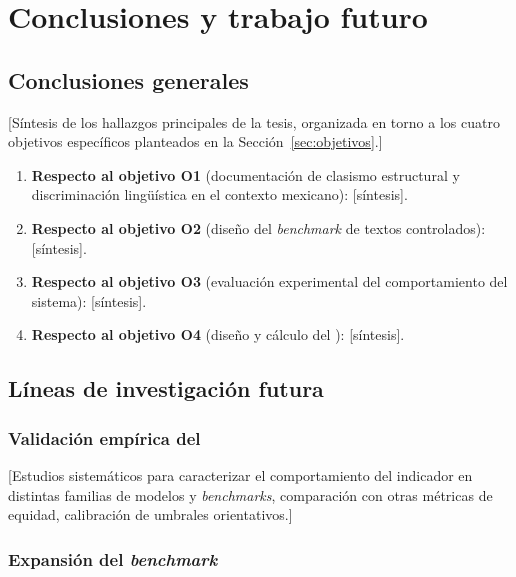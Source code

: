 \chapter{Conclusiones y trabajo futuro}
\label{cap:conclusiones}

\section{Conclusiones generales}
\label{sec:conclusiones-generales}

[Síntesis de los hallazgos principales de la tesis, organizada en torno a los
cuatro objetivos específicos planteados en la Sección~\ref{sec:objetivos}.]

\begin{enumerate}[label=\textbf{C\arabic*.},leftmargin=2.2em]
  \item \textbf{Respecto al objetivo O1} (documentación de clasismo
    estructural y discriminación lingüística en el contexto mexicano):
    [síntesis].
  \item \textbf{Respecto al objetivo O2} (diseño del \emph{benchmark} de
    textos controlados): [síntesis].
  \item \textbf{Respecto al objetivo O3} (evaluación experimental del
    comportamiento del sistema): [síntesis].
  \item \textbf{Respecto al objetivo O4} (diseño y cálculo del \INS):
    [síntesis].
\end{enumerate}

\section{Líneas de investigación futura}
\label{sec:trabajo-futuro}

\subsection{Validación empírica del \INS}

[Estudios sistemáticos para caracterizar el comportamiento del indicador en
distintas familias de modelos y \emph{benchmarks}, comparación con otras
métricas de equidad, calibración de umbrales orientativos.]

\subsection{Expansión del \textit{benchmark}}

